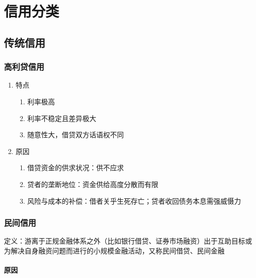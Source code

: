 \documentclass[12pt]{book}
\begin{document}
\section{信用分类}








\subsection{传统信用}

\subsubsection{高利贷信用}

\begin{enumerate}[1.]
    \item 特点
    \begin{enumerate}[(1)]
        \item 利率极高  
        \item 利率不稳定且差异极大  
        \item 随意性大，借贷双方话语权不同
    \end{enumerate}
    \item 原因 
    \begin{enumerate}[(1)]
        \item 借贷资金的供求状况：供不应求  
        \item 贷者的垄断地位：资金供给高度分散而有限  
        \item 风险与成本的补偿：借者关乎生死存亡；贷者收回债务本息需强威慑力   
    \end{enumerate}
\end{enumerate}

\subsubsection{民间信用}

定义：游离于正规金融体系之外（比如银行借贷、证券市场融资）出于互助目标或为解决自身融资问题而进行的小规模金融活动，又称民间借贷、民间金融

\paragraph{原因}
\end{document}
